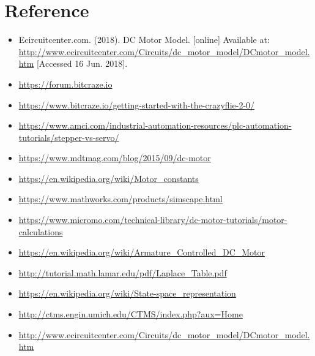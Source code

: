 \section{Reference}
\begin{itemize}
\item Ecircuitcenter.com. (2018). DC Motor Model. [online] Available at: \url{http://www.ecircuitcenter.com/Circuits/dc_motor_model/DCmotor_model.htm} [Accessed 16 Jun. 2018].

\item \url {https://forum.bitcraze.io}

\item \url {https://www.bitcraze.io/getting-started-with-the-crazyflie-2-0/}

\item \url{https://www.amci.com/industrial-automation-resources/plc-automation-tutorials/stepper-vs-servo/}



\item \url{https://www.mdtmag.com/blog/2015/09/dc-motor}


\item \url{https://en.wikipedia.org/wiki/Motor_constants}
\item \url{https://www.mathworks.com/products/simscape.html}
\item \url{https://www.micromo.com/technical-library/dc-motor-tutorials/motor-calculations}
\item \url{https://en.wikipedia.org/wiki/Armature_Controlled_DC_Motor}
\item \url{http://tutorial.math.lamar.edu/pdf/Laplace_Table.pdf}
\item \url{https://en.wikipedia.org/wiki/State-space_representation}
\item \url{http://ctms.engin.umich.edu/CTMS/index.php?aux=Home}
\item \url{http://www.ecircuitcenter.com/Circuits/dc_motor_model/DCmotor_model.htm}
\end{itemize}











